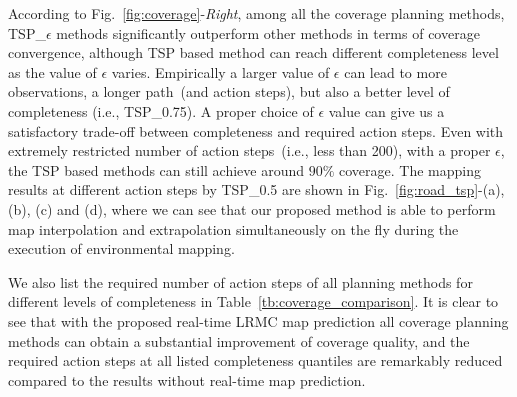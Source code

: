 According to Fig.~\ref{fig:coverage}-\textit{Right}, among all the coverage planning methods, TSP\_$\epsilon$ methods significantly outperform other methods in terms of coverage convergence, although TSP based method can reach different completeness level as the value of $\epsilon$ varies. 
Empirically a larger value of $\epsilon$ can lead to more observations, a longer path~(and action steps), but also a better level of completeness (i.e., TSP\_{0.75}). A proper choice of $\epsilon$ value can give us a satisfactory trade-off between completeness and required action steps. 
Even with extremely restricted number of action steps~(i.e., less than 200), with a proper $\epsilon$, the TSP based methods can still achieve around $90\%$ coverage. The mapping results at different action steps by TSP\_{0.5} are shown in Fig.~\ref{fig:road_tsp}-(a), (b), (c) and (d), where we can see that our proposed method is able to perform map interpolation and extrapolation simultaneously on the fly during the execution of environmental mapping.

We also list the required number of action steps of all planning methods for different levels of completeness in Table~\ref{tb:coverage_comparison}. It is clear to see that with the proposed real-time LRMC map prediction all coverage planning methods can obtain a substantial improvement of coverage quality, and the required action steps at all listed completeness quantiles are remarkably reduced compared to the results without real-time map prediction.

